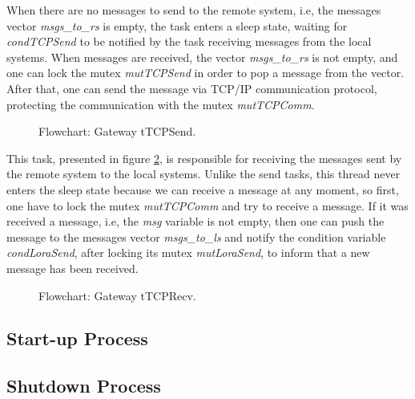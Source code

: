 When there are no messages to send to the remote system, i.e, the messages vector \textit{msgs\_to\_rs} is empty, the task enters a sleep state, waiting for \textit{condTCPSend} to be notified by the task receiving messages from the local systems. When messages are received, the vector \textit{msgs\_to\_rs} is not empty, and one can lock the mutex \textit{mutTCPSend} in order to pop a message from the vector. After that, one can send the message via TCP/IP communication protocol, protecting the communication with the mutex \textit{mutTCPComm}.

\begin{figure}[H]
	\centering
	\caption{Flowchart: Gateway tTCPSend.}
	\label{fig:gwtTCPSend}
\end{figure}

This task, presented in figure \ref{fig:gwtTCPRecv}, is responsible for receiving the messages sent by the remote system to the local systems. Unlike the send tasks, this thread never enters the sleep state because we can receive a message at any moment, so first, one have to lock the mutex \textit{mutTCPComm} and try to receive a message. If it was received a message, i.e, the \textit{msg} variable is not empty, then one can push the message to the messages vector \textit{msgs\_to\_ls} and notify the condition variable \textit{condLoraSend}, after locking its mutex \textit{mutLoraSend}, to inform that a new message has been received.

\begin{figure}[H]
	\centering
	\caption{Flowchart: Gateway tTCPRecv.}
	\label{fig:gwtTCPRecv}
\end{figure}

\subsection{Start-up Process}

\subsection{Shutdown Process}
